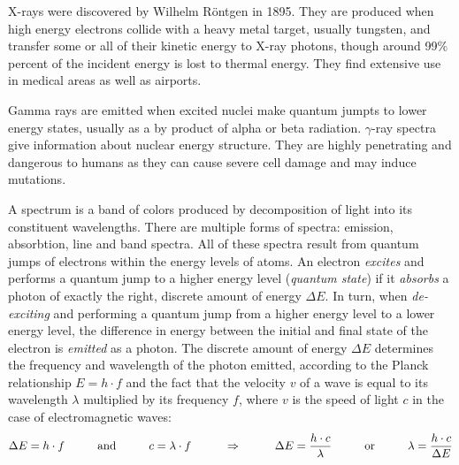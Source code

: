 \begin{itemize}

	X-rays were discovered by Wilhelm R\"{o}ntgen in 1895. They are produced when high energy electrons collide with a heavy metal target, usually tungsten, and transfer some or all of their kinetic energy to X-ray photons, though around 99\% percent of the incident energy is lost to thermal energy. They find extensive use in medical areas as well as airports.


	Gamma rays are emitted when excited nuclei make quantum jumpts to lower energy states, usually as a by product of alpha or beta radiation. $\gamma$-ray spectra give information about nuclear energy structure. They are highly penetrating and dangerous to humans as they can cause severe cell damage and may induce mutations.

\end{itemize}

\pagebreak


A spectrum is a band of colors produced by decomposition of light into its constituent wavelengths. There are multiple forms of spectra: emission, absorbtion, line and band spectra. All of these spectra result from quantum jumps of electrons within the energy levels of atoms. An electron \emph{excites} and performs a quantum jump to a higher energy level (\emph{quantum state}) if it \emph{absorbs} a photon of exactly the right, discrete amount of energy $\Delta E$. In turn, when \emph{de-exciting} and performing a quantum jump from a higher energy level to a lower energy level, the difference in energy between the initial and final state of the electron is \emph{emitted} as a photon. The discrete amount of energy $\Delta E$ determines the frequency and wavelength of the photon emitted, according to the Planck relationship $E = h \cdot f$ and the fact that the velocity $v$ of a wave is equal to its wavelength $\lambda$ multiplied by its frequency $f$, where $v$ is the speed of light $c$ in the case of electromagnetic waves: $$\Delta E = h \cdot f \hspace{1 cm} \text{and} \hspace{1 cm} c = \lambda \cdot f \hspace{1 cm} \Rightarrow \hspace{1 cm} \Delta E = \frac{h \cdot c}{\lambda} \hspace{1 cm} \text{or} \hspace{1 cm} \lambda = \frac{h \cdot c}{\Delta E}$$ 


